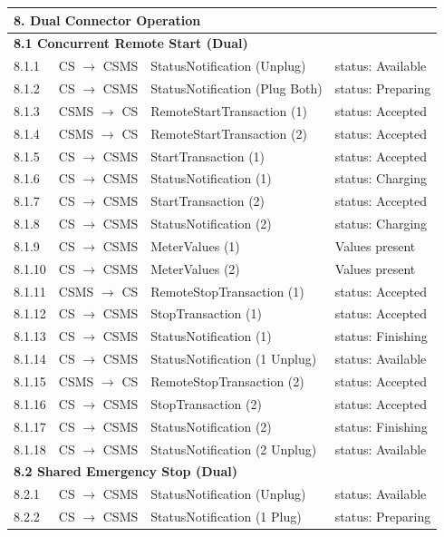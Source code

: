 \documentclass[a4paper,11pt]{report}
\begin{document}
\begin{footnotesize}
\begin{longtable}{|p{1.2cm}|p{2.5cm}|p{5.5cm}|p{6cm}|}
\multicolumn{4}{|l|}{\textbf{8. Dual Connector Operation}} \\
\hline
\multicolumn{4}{|l|}{\textbf{8.1 Concurrent Remote Start (Dual)}} \\
\hline
8.1.1 & CS $\to$ CSMS & StatusNotification (Unplug) & status: Available \\
\hline
8.1.2 & CS $\to$ CSMS & StatusNotification (Plug Both) & status: Preparing \\
\hline
8.1.3 & CSMS $\to$ CS & RemoteStartTransaction (1) & status: Accepted \\
\hline
8.1.4 & CSMS $\to$ CS & RemoteStartTransaction (2) & status: Accepted \\
\hline
8.1.5 & CS $\to$ CSMS & StartTransaction (1) & status: Accepted \\
\hline
8.1.6 & CS $\to$ CSMS & StatusNotification (1) & status: Charging \\
\hline
8.1.7 & CS $\to$ CSMS & StartTransaction (2) & status: Accepted \\
\hline
8.1.8 & CS $\to$ CSMS & StatusNotification (2) & status: Charging \\
\hline
8.1.9 & CS $\to$ CSMS & MeterValues (1) & Values present \\
\hline
8.1.10 & CS $\to$ CSMS & MeterValues (2) & Values present \\
\hline
8.1.11 & CSMS $\to$ CS & RemoteStopTransaction (1) & status: Accepted \\
\hline
8.1.12 & CS $\to$ CSMS & StopTransaction (1) & status: Accepted \\
\hline
8.1.13 & CS $\to$ CSMS & StatusNotification (1) & status: Finishing \\
\hline
8.1.14 & CS $\to$ CSMS & StatusNotification (1 Unplug) & status: Available \\
\hline
8.1.15 & CSMS $\to$ CS & RemoteStopTransaction (2) & status: Accepted \\
\hline
8.1.16 & CS $\to$ CSMS & StopTransaction (2) & status: Accepted \\
\hline
8.1.17 & CS $\to$ CSMS & StatusNotification (2) & status: Finishing \\
\hline
8.1.18 & CS $\to$ CSMS & StatusNotification (2 Unplug) & status: Available \\
\hline
\multicolumn{4}{|l|}{\textbf{8.2 Shared Emergency Stop (Dual)}} \\
\hline
8.2.1 & CS $\to$ CSMS & StatusNotification (Unplug) & status: Available \\
\hline
8.2.2 & CS $\to$ CSMS & StatusNotification (1 Plug) & status: Preparing \\

\end{longtable}
\end{footnotesize}
\end{document}
